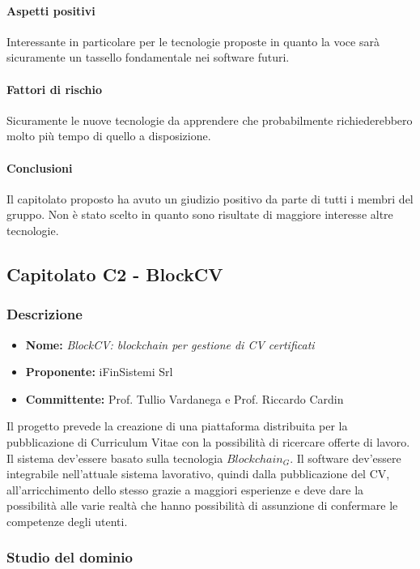 			\paragraph{Aspetti positivi} \Spazio
			Interessante in particolare per le tecnologie proposte in quanto la voce sarà sicuramente un tassello fondamentale nei software futuri.
			\paragraph{Fattori di rischio} \Spazio
			Sicuramente le nuove tecnologie da apprendere che probabilmente richiederebbero molto più tempo di quello a disposizione. 
			\paragraph{Conclusioni} \Spazio
			Il capitolato proposto ha avuto un giudizio positivo da parte di tutti i membri del gruppo. Non è stato scelto in quanto sono risultate di maggiore interesse altre tecnologie.
			
	\subsection{Capitolato C2 - BlockCV}
	\subsubsection{Descrizione}
	\begin{itemize}
		\item \textbf{Nome:} \emph{BlockCV: blockchain per gestione di CV certificati}
		\item \textbf{Proponente:} iFinSistemi Srl
		\item \textbf{Committente:} Prof. Tullio Vardanega e Prof. Riccardo Cardin
	\end{itemize}
	Il progetto prevede la creazione di una piattaforma distribuita per la pubblicazione di Curriculum Vitae con la possibilità di ricercare offerte di lavoro. Il sistema dev'essere basato sulla tecnologia $Blockchain_G$.
	Il software dev'essere integrabile nell'attuale sistema lavorativo, quindi dalla pubblicazione del CV, all'arricchimento dello stesso grazie a maggiori esperienze e deve dare la possibilità alle varie realtà che hanno possibilità di assunzione di confermare le competenze degli utenti.    
	\subsubsection{Studio del dominio}
